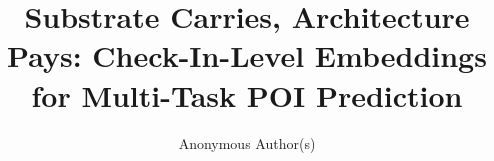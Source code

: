 \documentclass[runningheads]{llncs}
\begin{document}
\title{Substrate Carries, Architecture Pays: Check-In-Level Embeddings for
Multi-Task POI Prediction}


\author{Anonymous Author(s)}

\maketitle
\end{document}
